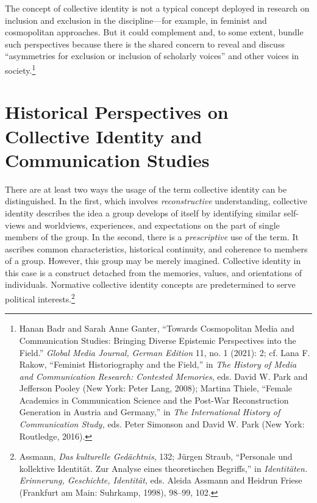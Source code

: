 \documentclass{tufte-handout}
\begin{document}
The concept of collective identity is not a typical concept deployed in
research on inclusion and exclusion in the discipline---for example, in
feminist and cosmopolitan approaches. But it could complement and, to
some extent, bundle such perspectives because there is the shared
concern to reveal and discuss ``asymmetries for exclusion or inclusion
of scholarly voices'' and other voices in
society.\footnote{Hanan Badr and Sarah Anne Ganter, ``Towards Cosmopolitan Media and
  Communication Studies: Bringing Diverse Epistemic Perspectives into
  the Field.'' \emph{Global Media Journal,} \emph{German Edition} 11,
  no. 1 (2021): 2; cf. Lana F. Rakow, ``Feminist Historiography and the
  Field,'' in \emph{The History of Media and Communication Research:
  Contested Memories}, eds. David W. Park and Jefferson Pooley (New
  York: Peter Lang, 2008); Martina Thiele, ``Female Academics in
  Communication Science and the Post-War Reconstruction Generation in
  Austria and Germany,'' in \emph{The International History of
  Communication Study,} eds. Peter Simonson and David W. Park (New York:
  Routledge, 2016).
}

\hypertarget{historical-perspectives-on-collective-identity-and-communication-studies}{%
\section{Historical Perspectives on Collective Identity and
Communication
Studies}\label{historical-perspectives-on-collective-identity-and-communication-studies}}

There are at least two ways the usage of the term collective identity
can be distinguished. In the first, which involves \emph{reconstructive}
understanding, collective identity describes the idea a group develops
of itself by identifying similar self-views and worldviews, experiences,
and expectations on the part of single members of the group. In the
second, there is a \emph{prescriptive} use of the term. It ascribes
common characteristics, historical continuity, and coherence to members
of a group. However, this group may be merely imagined. Collective
identity in this case is a construct detached from the memories, values,
and orientations of individuals. Normative collective identity concepts
are predetermined to serve political
interests.\footnote{Assmann, \emph{Das kulturelle Gedächtnis}, 132; Jürgen Straub,
  ``Personale und kollektive Identität. Zur Analyse eines theoretischen
  Begriffs,'' in \emph{Identitäten. Erinnerung, Geschichte, Identität},
  eds. Aleida Assmann and Heidrun Friese (Frankfurt am Main: Suhrkamp,
  1998), 98--99, 102.
}
\end{document}
